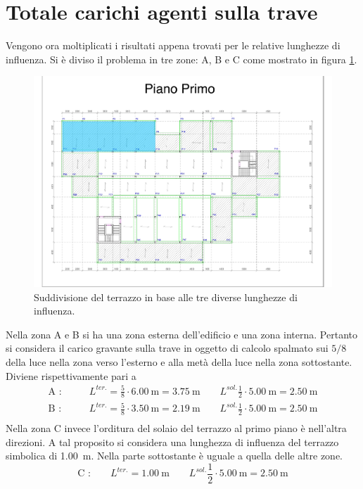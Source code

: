 \section{Totale carichi agenti sulla trave}
Vengono ora moltiplicati i risultati appena trovati per le relative lunghezze di influenza. 
Si è diviso il problema in tre zone: A, B e C come mostrato in figura \ref{fig:traveZonaABC}. 
\begin{figure}[tbp]
\centering
\includegraphics[trim=5.8cm 13cm 9.5cm 4.1cm,clip,frame,width=\textwidth]{IMG/Piante/Piante-ABC.pdf} 
\caption{Suddivisione del terrazzo in base alle tre diverse lunghezze di influenza.}
\label{fig:traveZonaABC}
\end{figure}
Nella zona A e B si ha una zona esterna dell'edificio e una zona interna.
Pertanto si considera il carico gravante sulla trave in oggetto di calcolo spalmato sui $5/8$ della luce nella zona verso l'esterno e alla metà della luce nella zona sottostante.  
Diviene rispettivamente pari a 
\begin{align*}
	\text{A :}&\qquad L^{ter.}=\frac{5}{8}\cdot\SI{6.00}{\meter}=\SI{3.75}{\meter} \qquad 
				L^{sol.} \frac{1}{2}\cdot\SI{5.00}{\meter} = \SI{2.50}{\meter}\\
	\text{B :}&\qquad L^{ter.}=\frac{5}{8}\cdot\SI{3.50}{\meter}=\SI{2.19}{\meter} \qquad 
				L^{sol.} \frac{1}{2}\cdot\SI{5.00}{\meter} = \SI{2.50}{\meter}\\
\end{align*}
Nella zona C invece l'orditura del solaio del terrazzo al primo piano è nell'altra direzioni. 
A tal proposito si considera una lunghezza di influenza del terrazzo simbolica di \SI{1.00}{\meter}.
Nella parte sottostante è uguale a quella delle altre zone.
\[
	\text{C :}\qquad L^{ter.}=\SI{1.00}{\meter} \qquad 
				L^{sol.} \frac{1}{2}\cdot\SI{5.00}{\meter} = \SI{2.50}{\meter}
\]

